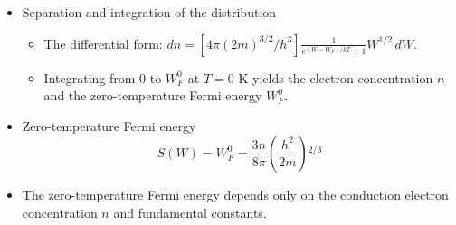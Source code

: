 \documentclass[t,aspectratio=169]{beamer}
\begin{document}
\begin{frame}
\begin{itemize}
\pagebreak
\item Separation and integration of the distribution
\begin{itemize}\setlength{\itemsep}{0pt}\setlength{\parskip}{0pt}
\item The differential form: $dn = \left[4\pi(2m)^{3/2}/h^3\right]\frac{1}{e^{(W-W_F)/kT}+1} W^{1/2}\,dW$.
\item Integrating from 0 to $W_F^0$ at $T=0$ K yields the electron concentration $n$ and the zero-temperature Fermi energy $W_F^0$.
\end{itemize}
\item{Zero-temperature Fermi energy}
\begin{equation*}
S\left(W\right)=W_F^0=\frac{3n}{8\pi}\left(\frac{h^2}{2m}\right)\!^{\!2/3}
\end{equation*}
\item The zero-temperature Fermi energy depends only on the conduction electron concentration $n$ and fundamental constants.

\end{itemize}
\end{frame}

\end{document}
